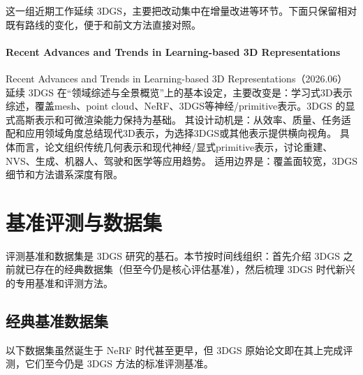 这一组近期工作延续 3DGS，主要把改动集中在增量改进等环节。下面只保留相对既有路线的变化，便于和前文方法直接对照。

\paragraph{Recent Advances and Trends in Learning-based 3D Representations}
Recent Advances and Trends in Learning-based 3D Representations（2026.06）~\cite{2606_04871} 延续 3DGS 在“领域综述与全景概览”上的基本设定，主要改变是：学习式3D表示综述，覆盖mesh、point cloud、NeRF、3DGS等神经/primitive表示。3DGS 的显式高斯表示和可微渲染能力保持为基础。
其设计动机是：从效率、质量、任务适配和应用领域角度总结现代3D表示，为选择3DGS或其他表示提供横向视角。
具体而言，论文组织传统几何表示和现代神经/显式primitive表示，讨论重建、NVS、生成、机器人、驾驶和医学等应用趋势。
适用边界是：覆盖面较宽，3DGS细节和方法谱系深度有限。
\section{基准评测与数据集}
\label{sec:01_3}

评测基准和数据集是 3DGS 研究的基石。本节按时间线组织：首先介绍 3DGS 之前就已存在的经典数据集（但至今仍是核心评估基准），然后梳理 3DGS 时代新兴的专用基准和评测方法。

\subsection{经典基准数据集}

以下数据集虽然诞生于 NeRF 时代甚至更早，但 3DGS 原始论文即在其上完成评测，它们至今仍是 3DGS 方法的标准评测基准。

